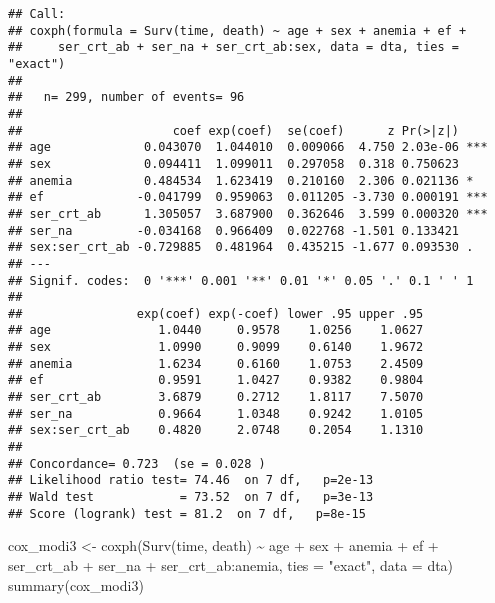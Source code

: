 \documentclass[
]{article}
\newenvironment{Shaded}{\begin{snugshade}}{\end{snugshade}}
\newcommand{\AttributeTok}[1]{\textcolor[rgb]{0.77,0.63,0.00}{#1}}
\newcommand{\FunctionTok}[1]{\textcolor[rgb]{0.00,0.00,0.00}{#1}}
\newcommand{\NormalTok}[1]{#1}
\newcommand{\OtherTok}[1]{\textcolor[rgb]{0.56,0.35,0.01}{#1}}
\newcommand{\SpecialCharTok}[1]{\textcolor[rgb]{0.00,0.00,0.00}{#1}}
\newcommand{\StringTok}[1]{\textcolor[rgb]{0.31,0.60,0.02}{#1}}
\begin{document}
\begin{verbatim}
## Call:
## coxph(formula = Surv(time, death) ~ age + sex + anemia + ef + 
##     ser_crt_ab + ser_na + ser_crt_ab:sex, data = dta, ties = "exact")
## 
##   n= 299, number of events= 96 
## 
##                     coef exp(coef)  se(coef)      z Pr(>|z|)    
## age             0.043070  1.044010  0.009066  4.750 2.03e-06 ***
## sex             0.094411  1.099011  0.297058  0.318 0.750623    
## anemia          0.484534  1.623419  0.210160  2.306 0.021136 *  
## ef             -0.041799  0.959063  0.011205 -3.730 0.000191 ***
## ser_crt_ab      1.305057  3.687900  0.362646  3.599 0.000320 ***
## ser_na         -0.034168  0.966409  0.022768 -1.501 0.133421    
## sex:ser_crt_ab -0.729885  0.481964  0.435215 -1.677 0.093530 .  
## ---
## Signif. codes:  0 '***' 0.001 '**' 0.01 '*' 0.05 '.' 0.1 ' ' 1
## 
##                exp(coef) exp(-coef) lower .95 upper .95
## age               1.0440     0.9578    1.0256    1.0627
## sex               1.0990     0.9099    0.6140    1.9672
## anemia            1.6234     0.6160    1.0753    2.4509
## ef                0.9591     1.0427    0.9382    0.9804
## ser_crt_ab        3.6879     0.2712    1.8117    7.5070
## ser_na            0.9664     1.0348    0.9242    1.0105
## sex:ser_crt_ab    0.4820     2.0748    0.2054    1.1310
## 
## Concordance= 0.723  (se = 0.028 )
## Likelihood ratio test= 74.46  on 7 df,   p=2e-13
## Wald test            = 73.52  on 7 df,   p=3e-13
## Score (logrank) test = 81.2  on 7 df,   p=8e-15
\end{verbatim}

\begin{Shaded}
\begin{Highlighting}[]
\NormalTok{cox\_modi3 }\OtherTok{\textless{}{-}} \FunctionTok{coxph}\NormalTok{(}\FunctionTok{Surv}\NormalTok{(time, death) }\SpecialCharTok{\textasciitilde{}}\NormalTok{ age }\SpecialCharTok{+}\NormalTok{ sex }\SpecialCharTok{+}\NormalTok{ anemia }\SpecialCharTok{+}\NormalTok{ ef }\SpecialCharTok{+}\NormalTok{ ser\_crt\_ab }\SpecialCharTok{+}\NormalTok{ ser\_na }\SpecialCharTok{+}\NormalTok{ ser\_crt\_ab}\SpecialCharTok{:}\NormalTok{anemia, }\AttributeTok{ties =} \StringTok{"exact"}\NormalTok{, }\AttributeTok{data =}\NormalTok{ dta)}
\FunctionTok{summary}\NormalTok{(cox\_modi3)}
\end{Highlighting}
\end{Shaded}
\end{document}
